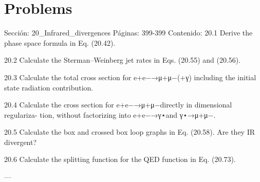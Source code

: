 \section*{Problems}
Sección: 20_Infrared_divergences
Páginas: 399-399
Contenido:
20.1 Derive the phase space formula in Eq. (20.42).

20.2 Calculate the Sterman–Weinberg jet rates in Eqs. (20.55) and (20.56).

20.3 Calculate the total cross section for e+e−→μ+μ−(+γ) including the initial state
radiation contribution.

20.4 Calculate the cross section for e+e−→μ+μ−directly in dimensional regulariza-
tion, without factorizing into e+e−→γ⋆and γ⋆→μ+μ−.

20.5 Calculate the box and crossed box loop graphs in Eq. (20.58). Are they IR divergent?

20.6 Calculate the splitting function for the QED function in Eq. (20.73).


---


